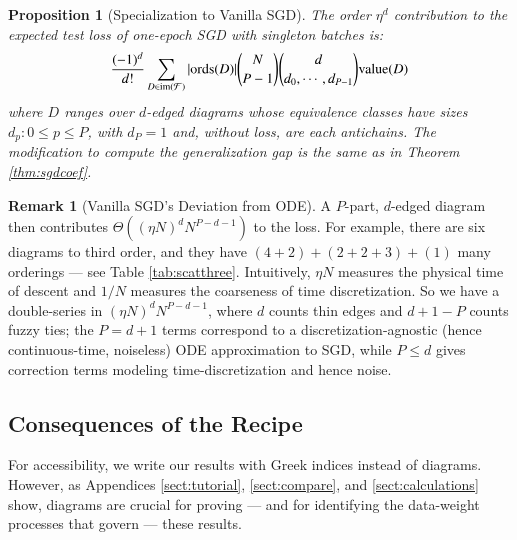 \documentclass{article}
\theoremstyle{plain}
\newtheorem{prop}{Proposition}
\theoremstyle{definition}
\newtheorem{rmk}{Remark}
\newcommand{\Free}{\mathcal{F}}
\newcommand{\image}{\text{\textnormal{im}}}
\newcommand{\dvalue}{\text{\textnormal{value}}}
\newcommand{\ords}{\text{\textnormal{ords}}}
\begin{document}
        \begin{prop}[Specialization to Vanilla SGD] \label{prop:vanilla}
            The order $\eta^d$ contribution to the expected test loss of
            one-epoch SGD with singleton batches is:
            \begin{equation*}\label{eq:sgdbasiccoef}
                \frac{(-1)^d}{d!} \sum_{D\in \image(\Free)} 
                |\ords(D)| {N \choose P-1} {d \choose d_0,\cdots,d_{P-1}}
                \dvalue(D)
            \end{equation*}
            where $D$ ranges over $d$-edged diagrams whose equivalence classes
            have sizes $d_p: 0\leq p\leq P$, with $d_P=1$
            and, without loss, are each antichains.  The modification to
            compute the generalization gap is the same as in Theorem
            \ref{thm:sgdcoef}.
        \end{prop}
        \begin{rmk}[Vanilla SGD's Deviation from ODE] \label{rmk:vsode}
            A $P$-part, $d$-edged diagram then contributes $\Theta\left((\eta
            N)^d N^{P-d-1}\right)$ to the loss.  For example, there are six
            diagrams to third order, and they have $(4+2)+(2+2+3)+(1)$ many
            orderings --- see Table \ref{tab:scatthree}.  Intuitively, $\eta N$
            measures the physical time of descent and $1/N$ measures the
            coarseness of time discretization.  So we have a double-series in
            $(\eta N)^d N^{P-d-1}$, where $d$ counts thin edges and $d+1-P$
            counts fuzzy ties; the $P=d+1$ terms correspond to a
            discretization-agnostic (hence continuous-time, noiseless) ODE
            approximation to SGD, while $P\leq d$ gives correction terms
            modeling time-discretization and hence noise.  
        \end{rmk}


    \subsection{Consequences of the Recipe}
        For accessibility, we write our results with Greek indices instead of
        diagrams.  However, as Appendices \ref{sect:tutorial},
        \ref{sect:compare}, and \ref{sect:calculations} show, diagrams are
        crucial for proving --- and for identifying the data-weight processes
        that govern --- these results.
\end{document}
